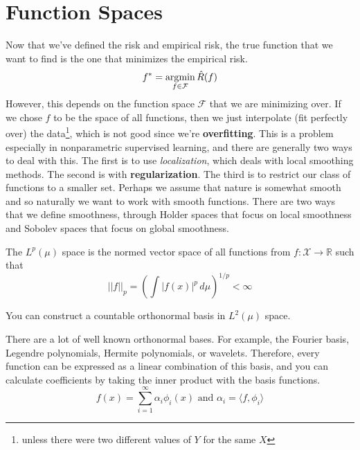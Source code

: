 \section{Function Spaces}

  Now that we've defined the risk and empirical risk, the true function that we want to find is the one that minimizes the empirical risk. 
  \begin{equation}
    f^\ast = \argmin_{f \in \mathcal{F}} \hat{R} (f)
  \end{equation}
  However, this depends on the function space $\mathcal{F}$ that we are minimizing over. If we chose $f$ to be the space of all functions, then we just interpolate (fit perfectly over) the data\footnote{unless there were two different values of $Y$ for the same $X$}, which is not good since we're \textbf{overfitting}. This is a problem especially in nonparametric supervised learning, and there are generally two ways to deal with this. The first is to use \textit{localization}, which deals with local smoothing methods. The second is with \textbf{regularization}. The third is to restrict our class of functions to a smaller set. Perhaps we assume that nature is somewhat smooth and so naturally we want to work with smooth functions. There are two ways that we define smoothness, through Holder spaces that focus on local smoothness and Sobolev spaces that focus on global smoothness. 

  \begin{definition}[$L^p$ Space]
    The $L^p (\mu)$ space is the normed vector space of all functions from $f: \mathcal{X} \rightarrow \mathbb{R}$ such that 
    \begin{equation}
      ||f||_p = \left( \int |f(x)|^p \,d\mu \right)^{1/p} < \infty
    \end{equation}
  \end{definition}

  \begin{theorem}
    You can construct a countable orthonormal basis in $L^2 (\mu)$ space. 
  \end{theorem}

  There are a lot of well known orthonormal bases. For example, the Fourier basis, Legendre polynomials, Hermite polynomials, or wavelets. Therefore, every function can be expressed as a linear combination of this basis, and you can calculate coefficients by taking the inner product with the basis functions. 
  \begin{equation}
    f(x) = \sum_{i=1}^\infty \alpha_i \phi_i (x) \text{ and } \alpha_i = \langle f, \phi_i \rangle
  \end{equation}

